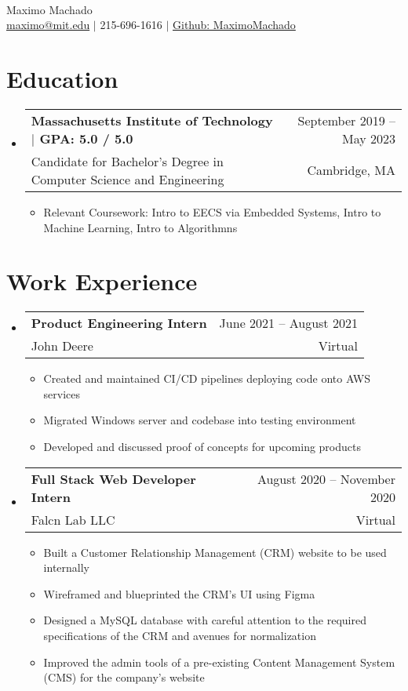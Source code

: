 \documentclass[letterpaper,12pt]{article} %
\makeatletter
\newcommand{\CVItem}[1]{
  \item\small{
    {#1 \vspace{-2pt}}
  }
}
\newcommand{\CVSubheading}[4]{
  \vspace{-2pt}\item
    \begin{tabular*}{0.97\textwidth}[t]{l@{\extracolsep{\fill}}r}
      \textbf{#1} & #2 \\
      \small#3 & \small #4 \\
    \end{tabular*}\vspace{-7pt}
}
\newcommand{\CVSubHeadingListStart}{\begin{itemize}[leftmargin=0.15in, label={}]} %
\newcommand{\CVSubHeadingListEnd}{\end{itemize}}
\newcommand{\CVItemListStart}{\begin{itemize}}
\newcommand{\CVItemListEnd}{\end{itemize}\vspace{-5pt}}
\makeatother
\begin{document}

\begin{minipage}[c]{0.05\textwidth}
  \-\
\end{minipage}

\begin{center}
  \Huge Maximo Machado \\ \vspace{1pt} %
  \small
  \href{mailto:maximo@mit.edu}{maximo@mit.edu} $|$
  215-696-1616 $|$
  \href{https://github.com/MaximoMachado}{Github: MaximoMachado}
\end{center}
\vspace{-17pt} %

\section{Education}
\CVSubHeadingListStart
\CVSubheading
{{Massachusetts Institute of Technology $|$ \small{GPA: 5.0 / 5.0}}}{September 2019 -- May 2023}
{Candidate for Bachelor's Degree in Computer Science and Engineering}{Cambridge, MA}

\CVItemListStart
\CVItem{Relevant Coursework:
  Intro to EECS via Embedded Systems,
  Intro to Machine Learning,
  Intro to Algorithmns}
\CVItemListEnd
\CVSubHeadingListEnd

\section{Work Experience}
\CVSubHeadingListStart
\CVSubheading
{Product Engineering Intern}{June 2021 -- August 2021}
{John Deere}{Virtual}
\CVItemListStart
\CVItem{Created and maintained CI/CD pipelines deploying code onto AWS services}
\CVItem{Migrated Windows server and codebase into testing environment}
\CVItem{Developed and discussed proof of concepts for upcoming products}
\CVItemListEnd
\CVSubheading
{Full Stack Web Developer Intern}{August 2020 -- November 2020}
{Falcn Lab LLC}{Virtual}
\CVItemListStart
\CVItem{Built a Customer Relationship Management (CRM) website to be used internally}
\CVItem{Wireframed and blueprinted the CRM's UI using Figma}
\CVItem{Designed a MySQL database with careful attention to the required specifications of the CRM and avenues for normalization}
\CVItem{Improved the admin tools of a pre-existing Content Management System (CMS) for the company's website}
\CVItemListEnd
\CVSubHeadingListEnd
\end{document}
